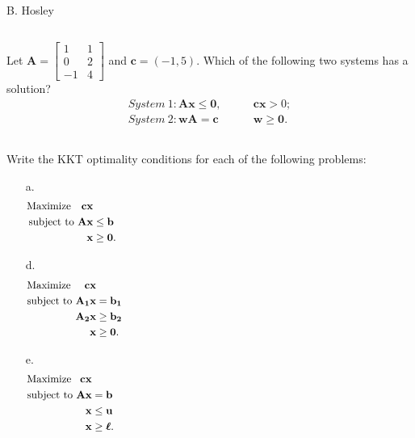 \documentclass[12pt]{amsart}
\begin{document}
\raggedbottom

\hspace{\fill} {\large B. Hosley}
\bigskip


\setcounter{section}{5}
\setcounter{subsection}{34}
\subsection{}
Let \(\mathbf{A} = \begin{bmatrix} 1 & 1 \\ 0 & 2 \\ -1 & 4 \end{bmatrix}\)
and \(\mathbf{c} = (-1,5) \).
Which of the following two systems has a solution?
\begin{align*}
	System\ 1: \mathbf{Ax}\leq\mathbf{0},& \qquad \mathbf{cx}>0; \\
	System\ 2: \mathbf{wA}=\mathbf{c}& \qquad \mathbf{w}\geq\mathbf{0}.
\end{align*}


\setcounter{subsection}{40}
\subsection{}
Write the KKT optimality conditions for each of the following problems:
\begin{enumerate}
	\item[a.] \begin{align*}
		\text{Maximize }\,\,\ \mathbf{cx} & \hspace{75ex}\\
		\text{subject to  } \mathbf{Ax} &\leq \mathbf{b} \\
		\mathbf{x} &\geq \mathbf{0}.
	\end{align*}
	\item[d.]\begin{align*}
		\text{Maximize }\quad \mathbf{cx} & \hspace{75ex}\\
		\text{subject to  } \mathbf{A_1x} &= \mathbf{b_1} \\
		\mathbf{A_2x} &\geq \mathbf{b_2} \\
		\mathbf{x} &\geq \mathbf{0}.
	\end{align*}
	\item[e.] \begin{align*}
		\text{Maximize }\,\ \mathbf{cx} & \hspace{75ex}\\
		\text{subject to  } \mathbf{Ax} &= \mathbf{b} \\
		\mathbf{x} &\leq \mathbf{u} \\
		\mathbf{x} &\geq \boldsymbol{\ell}.
	\end{align*}
\end{enumerate}
\end{document}
